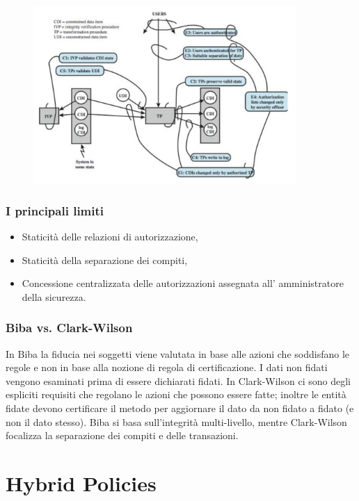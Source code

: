 \begin{figure}[H]
      \centering
      \includegraphics[width=10cm, keepaspectratio]{capitoli/policy/imgs/clark_wilson5.png}
\end{figure}

\subsubsection{I principali limiti}
\begin{itemize}
      \item Staticità delle relazioni di autorizzazione,
      \item Staticità della separazione dei compiti,
      \item Concessione centralizzata delle autorizzazioni assegnata all'
            amministratore della sicurezza.
\end{itemize}

\subsubsection{Biba vs. Clark-Wilson}
In Biba la fiducia nei soggetti viene valutata in base alle azioni
che soddisfano le regole e non in base alla nozione di regola di certificazione.
I dati non fidati
vengono esaminati prima di essere dichiarati fidati. In Clark-Wilson ci sono
degli espliciti requisiti
che regolano le azioni che possono essere fatte; inoltre le entità fidate devono
certificare il metodo
per aggiornare il dato da non fidato a fidato (e non il dato stesso).
Biba si basa sull'integrità multi-livello, mentre Clark-Wilson focalizza la
separazione dei compiti e
delle transazioni.


\section{Hybrid Policies}

